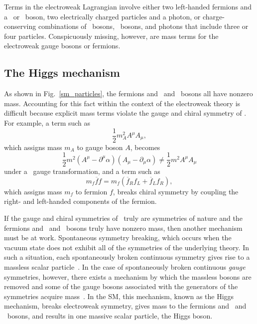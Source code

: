 Terms in the electroweak Lagrangian involve either two left-handed fermions and a \PWpm\ or \cPZ\ boson, two electrically charged particles and a photon, or charge-conserving combinations of \PWpm\ bosons, \cPZ\ bosons, and photons that include three or four particles.  Conspicuously missing, however, are mass terms for the electroweak gauge bosons or fermions.

\subsection{The Higgs mechanism}
As shown in Fig.~\ref{sm_particles}, the fermions and \PWpm\ and \cPZ\ bosons all have nonzero mass. Accounting for this fact within the context of the electroweak theory is difficult because explicit mass terms violate the gauge and chiral symmetry of \ewsymm. For example, a term such as
\begin{equation}
    \frac{1}{2}m_{A}^{2}A^{\mu}A_{\mu},
\end{equation}
which assigns mass $m_{A}$ to gauge boson $A$, becomes
\begin{equation}
    \frac{1}{2}m^{2}(A^{\mu}-\partial^{\mu}\alpha)(A_{\mu}-\partial_{\mu}\alpha) \neq \frac{1}{2}m^{2}A^{\mu}A_{\mu}
\end{equation}
under a \uoney\ gauge transformation, and a term such as
\begin{equation}
    m_{f}\overline{f}f = m_{f}(\overline{f}_{R}f_{L} + \overline{f}_{L}f_{R}),
\end{equation}
which assigns mass $m_{f}$ to fermion $f$, breaks chiral symmetry by coupling the right- and left-handed components of the fermion.

If the gauge and chiral symmetries of \smsymm\ truly are symmetries of nature and the fermions and \PWpm\ and \cPZ\ bosons truly have nonzero mass, then another mechanism must be at work. Spontaneous symmetry breaking, which occurs when the vacuum state does not exhibit all of the symmetries of the underlying theory. In such a situation, each spontaneously broken continuous symmetry gives rise to a massless scalar particle~\cite{goldstone_salam_weinberg}. In the case of spontaneously broken continuous \textit{gauge} symmetries, however, there exists a mechanism by which the massless bosons are removed and some of the gauge bosons associated with the generators of the symmetries acquire mass~\cite{englert, higgs, kibble}. In the SM, this mechanism, known as the Higgs mechanism, breaks electroweak symmetry, gives mass to the fermions and \PWpm\ and \cPZ\ bosons, and results in one massive scalar particle, the Higgs boson.


